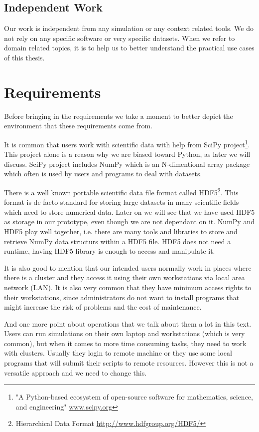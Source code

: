 \subsection{Independent Work}
Our work is independent from any simulation or any context related tools.
We do not rely on any specific software or very specific datasets.
When we refer to domain related topics, 
it is to help us to better understand the practical use cases of this thesis.


\section{Requirements}
Before bringing in the requirements we take a moment to better depict the environment that these requirements come from.

It is common that users work with scientific data with help from SciPy 
project\footnote{"A Python-based ecosystem of open-source software for mathematics, science, and engineering" \url{www.scipy.org}}.
This project alone is a reason why we are biased toward Python, as later we will discuss.
SciPy project includes NumPy which is an N-dimentional array package which often is used by users and programs
to deal with datasets. 

There is a well known portable scientific data file format called 
HDF5\footnote{Hierarchical Data Format \url{http://www.hdfgroup.org/HDF5/}}.
This format is de facto standard for storing large datasets in many scientific fields which need to store numerical data.
Later on we will see that we have used HDF5 as storage in our prototype, even though we are not dependant on it.
NumPy and HDF5 play well together, i.e. there are many tools and libraries to store and retrieve NumPy data structurs 
within a HDF5 file. HDF5 does not need a runtime, having HDF5 library is enough to access and manipulate it.

It is also good to mention that our intended users normally work in places where there is a cluster
and they access it using their own workstations via local area network (LAN).
It is also very common that they have minimum access rights to their workstations, 
since administrators do not want to install programs that might increase the risk of problems and the cost of maintenance.

And one more point about operations that we talk about them a lot in this text.
Users can run simulations on their own laptop and workstations (which is very common),
but when it comes to more time consuming tasks, they need to work with clusters.
Usually they login to remote machine or they use some local programs that will submit their scripts to remote resources.
However this is not a versatile approach and we need to change this.

